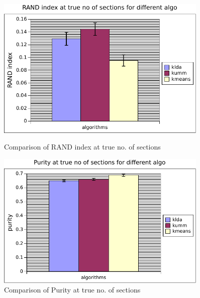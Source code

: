 \begin{figure}
\label{fig:clk0_cmp}
    \centering
    \begin{minipage}{0.45\textwidth}
        \centering
        \includegraphics[width=0.9\textwidth]{fig/rand_k0_comp.pdf}
        \caption{Comparison of RAND index at true no. of sections}
    \end{minipage}\hfill
    \begin{minipage}{0.45\textwidth}
        \centering
        \includegraphics[width=0.9\textwidth]{fig/purity_k0_comp.pdf}
        \caption{Comparison of Purity at true no. of sections}
    \end{minipage}
\end{figure}

